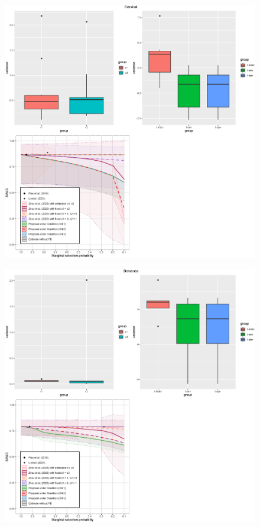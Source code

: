 \documentclass[
]{article}
\begin{document}
\begin{figure}
\begin{center}
\centerline{\includegraphics[width=\textwidth]{var-cer.eps}}
\end{center}
\end{figure}

\begin{figure}
\begin{center}
\centerline{\includegraphics[width=\textwidth]{var-dem.eps}}
\end{center}
\end{figure}
\end{document}
